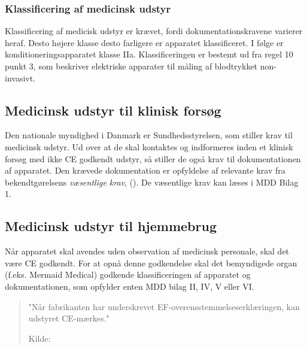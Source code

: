 \subsubsection{Klassificering af medicinsk udstyr}
Klassificering af medicisk udstyr er krævet, fordi dokumentationskravene varierer heraf. Desto højere klasse desto farligere er apparatet klassificeret. I følge \cite{RefWorks:42} er konditioneringsapparatet klasse IIa. Klassificeringen er bestemt ud fra regel 10 punkt 3, som beskriver elektriske apparater til måling af blodtrykket non-invasivt.

\subsection{Medicinsk udstyr til klinisk forsøg}
Den nationale myndighed i Danmark er Sundhedsstyrelsen, som stiller krav til medicinsk udstyr. Ud over at de skal kontaktes og indformeres inden et klinisk forsøg med ikke CE godkendt udstyr, så stiller de også krav til dokumentationen af apparatet. Den krævede dokumentation er opfyldelse af relevante krav fra bekendtgørelsens \textit{væsentlige krav}, (\cite{RefWorks:41}). De væsentlige krav kan læses i MDD Bilag 1.

\subsection{Medicinsk udstyr til hjemmebrug}
Når apparatet skal avendes uden observation af medicinsk personale, skal det være CE godkendt. For at opnå denne godkendelse skal det bemyndigede organ (f.eks. Mermaid Medical) godkende klassificeringen af apparatet og dokumentationen, som opfylder enten MDD bilag II, IV, V eller VI. 

\begin{quote}
	"Når fabrikanten har underskrevet EF-overensstemmelseserklæringen, kan udstyret CE-mærkes."
	
	Kilde: \cite{RefWorks:43}
\end{quote}